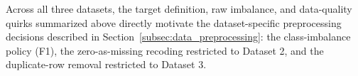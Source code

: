\begin{sloppypar}
Across all three datasets, the target definition, raw imbalance, and
data-quality quirks summarized above directly motivate the dataset-specific
preprocessing decisions described in Section~\ref{subsec:data_preprocessing}:
the class-imbalance policy (F1), the zero-as-missing recoding restricted to
Dataset 2, and the duplicate-row removal restricted to Dataset 3.
\end{sloppypar}

